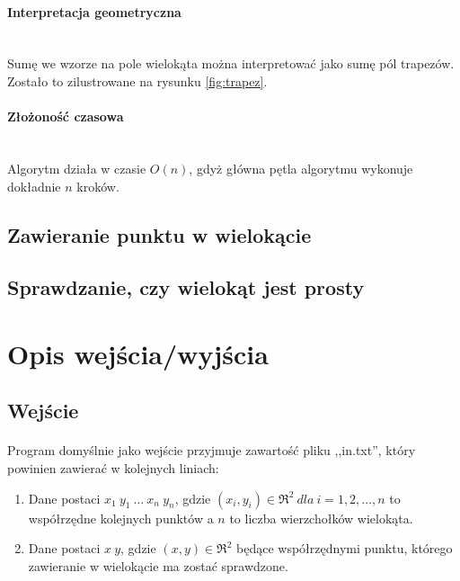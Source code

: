 \documentclass{article}
\begin{document}
\paragraph{Interpretacja geometryczna} \mbox{}\\
Sumę we wzorze na pole wielokąta można interpretować jako sumę pól trapezów. Zostało to zilustrowane na rysunku \ref{fig:trapez}.

\paragraph{Złożoność czasowa} \mbox{}\\
Algorytm działa w czasie \(O(n)\), gdyż główna pętla algorytmu wykonuje dokładnie \(n\) kroków.

\subsection{Zawieranie punktu w wielokącie}


\subsection{Sprawdzanie, czy wielokąt jest prosty}



\section{Opis wejścia/wyjścia}

\subsection{Wejście}

\paragraph{}
Program domyślnie jako wejście przyjmuje zawartość pliku ,,in.txt'', który powinien zawierać w kolejnych liniach:
\begin{enumerate}
\item Dane postaci \(x_1\ y_1\ ...\ x_n\ y_n\), gdzie \((x_i,y_i) \in \Re^{2} \ dla\ i=1,2,...,n\) to współrzędne kolejnych punktów a \(n\) to liczba wierzchołków wielokąta.
\item Dane postaci \(x\ y\), gdzie \((x,y) \in \Re^{2}\) będące współrzędnymi punktu, którego zawieranie w wielokącie ma zostać sprawdzone.
\end{enumerate}
\end{document}
